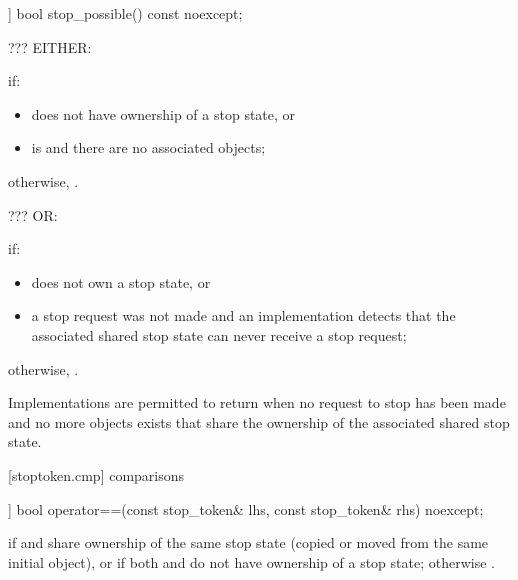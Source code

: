 {%
\begin{itemdecl}
[[nodiscard]] bool stop_possible() const noexcept;
\end{itemdecl}
\begin{itemdescr}

  {\color{blue} ??? EITHER: }

  \pnum\returns {} if:
  \begin{itemize}
   \item {} does not have ownership of a stop state, or
   \item {} is  and there are no associated  objects;
  \end{itemize}
        otherwise, .

  {\color{blue} ??? OR: }
  
  \pnum\returns {} if:
  \begin{itemize}
   \item {} does not own a stop state, or
   \item a stop request was not made and 
         an implementation detects that the associated shared stop state can never receive a stop request;
  \end{itemize}
        otherwise, .
                \begin{note} Implementations are permitted to return  when no request to stop
                     has been made and no more 
                     objects exists that share the ownership of the associated shared stop state.
                \end{note}

\end{itemdescr}


[stoptoken.cmp]{ comparisons}

%
\begin{itemdecl}
[[nodiscard]] bool operator==(const stop_token& lhs, const stop_token& rhs) noexcept;
\end{itemdecl}
\begin{itemdescr}
  \pnum\returns {} if  and  share ownership
                of the same stop state
                (copied or moved from the same initial  object),
                or if both  and  do not have ownership of a stop state;
                otherwise .
\end{itemdescr}

}
